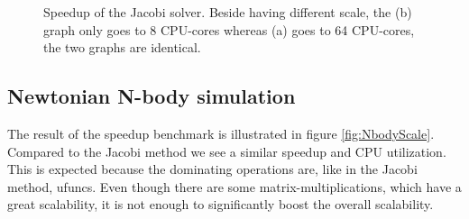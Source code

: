 \documentclass[10pt]{article}
\begin{document}
\begin{figure}%
  \begin{center}%
    \caption{Speedup of the Jacobi solver. Beside having different scale, the (b) graph only goes to 8 CPU-cores whereas (a) goes to 64 CPU-cores, the two graphs are identical.}%
    \label{fig:JacobiScale}%
  \end{center}
\end{figure}


\subsection{Newtonian N-body simulation}
The result of the speedup benchmark is illustrated in figure \ref{fig:NbodyScale}. Compared to the Jacobi method we see a similar speedup and CPU utilization. This is expected because the dominating operations are, like in the Jacobi method, ufuncs. Even though there are some matrix-multiplications, which have a great scalability, it is not enough to significantly boost the overall scalability.
\end{document}
